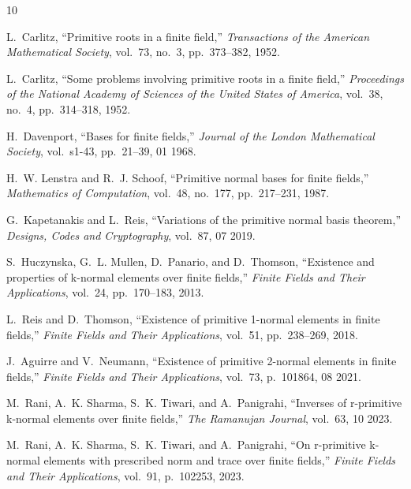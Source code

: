 \documentclass[12pt,a4paper]{article}
\theoremstyle{plain}
\theoremstyle{definition}
\numberwithin{equation}{section}
\begin{document}
    \begin{thebibliography}{10}
    	
    	L.~Carlitz, ``Primitive roots in a finite field,'' {\em Transactions of the
    		American Mathematical Society}, vol.~73, no.~3, pp.~373--382, 1952.
    	
    	L.~Carlitz, ``Some problems involving primitive roots in a finite field,'' {\em
    		Proceedings of the National Academy of Sciences of the United States of
    		America}, vol.~38, no.~4, pp.~314--318, 1952.
    	
    	H.~Davenport, ``Bases for finite fields,'' {\em Journal of the London
    		Mathematical Society}, vol.~s1-43, pp.~21--39, 01 1968.
    	
    	H.~W. Lenstra and R.~J. Schoof, ``Primitive normal bases for finite fields,''
    	{\em Mathematics of Computation}, vol.~48, no.~177, pp.~217--231, 1987.
    	
    	G.~Kapetanakis and L.~Reis, ``Variations of the primitive normal basis
    	theorem,'' {\em Designs, Codes and Cryptography}, vol.~87, 07 2019.
    	
    	S.~Huczynska, G.~L. Mullen, D.~Panario, and D.~Thomson, ``Existence and
    	properties of k-normal elements over finite fields,'' {\em Finite Fields and
    		Their Applications}, vol.~24, pp.~170--183, 2013.
    	
    	L.~Reis and D.~Thomson, ``Existence of primitive 1-normal elements in finite
    	fields,'' {\em Finite Fields and Their Applications}, vol.~51, pp.~238--269,
    	2018.
    	
    	J.~Aguirre and V.~Neumann, ``Existence of primitive 2-normal elements in finite
    	fields,'' {\em Finite Fields and Their Applications}, vol.~73, p.~101864, 08
    	2021.
    	
    	M.~Rani, A.~K. Sharma, S.~K. Tiwari, and A.~Panigrahi, ``Inverses of
    	r-primitive k-normal elements over finite fields,'' {\em The Ramanujan
    		Journal}, vol.~63, 10 2023.
    	
    	M.~Rani, A.~K. Sharma, S.~K. Tiwari, and A.~Panigrahi, ``On r-primitive
    	k-normal elements with prescribed norm and trace over finite fields,'' {\em
    		Finite Fields and Their Applications}, vol.~91, p.~102253, 2023.
    	

\end{thebibliography}
\end{document}
